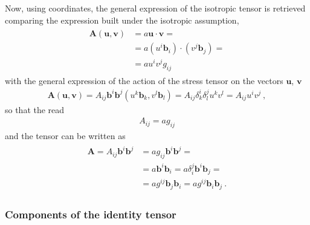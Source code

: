\documentclass[letterpaper,10pt,english]{jupyterBook}
\begin{document}
\sphinxAtStartPar
Now, using coordinates, the general expression of the isotropic tensor is retrieved comparing the expression built under the isotropic assumption,
\begin{equation*}
\begin{split}\begin{aligned}
  \mathbf{A}(\mathbf{u}, \mathbf{v}) 
  & = a \mathbf{u} \cdot \mathbf{v} = \\
  & = a \left( u^i \mathbf{b}_i \right) \cdot \left( v^j \mathbf{b}_j \right) = \\
  & = a u^i v^j g_{ij}
\end{aligned}\end{split}
\end{equation*}
\sphinxAtStartPar
with the general expression of the action of the stress tensor on the vectors \(\mathbf{u}\), \(\mathbf{v}\)
\begin{equation*}
\begin{split}\mathbf{A}(\mathbf{u}, \mathbf{v}) = A_{ij} \mathbf{b}^i \mathbf{b}^j \left( u^k \mathbf{b}_k, v^l \mathbf{b}_l \right) = A_{ij} \delta^i_k \delta^j_l u^k v^l = A_{ij} u^i v^j \ ,\end{split}
\end{equation*}
\sphinxAtStartPar
so that the  read
\begin{equation*}
\begin{split}A_{ij} = a g_{ij}\end{split}
\end{equation*}
\sphinxAtStartPar
and the tensor can be written as
\begin{equation*}
\begin{split}\begin{aligned}
  \mathbf{A} 
  = A_{ij} \mathbf{b}^i \mathbf{b}^j 
  & = a g_{ij}\mathbf{b}^i\mathbf{b}^j = \\
  & = a \mathbf{b}^i\mathbf{b}_i = a \delta_i^j \mathbf{b}^i \mathbf{b}_j = \\
  & = a g^{ij} \mathbf{b}_j \mathbf{b}_i = a g^{ij} \mathbf{b}_i \mathbf{b}_j \ .
\end{aligned}\end{split}
\end{equation*}\subsubsection*{Components of the identity tensor}
\end{document}
